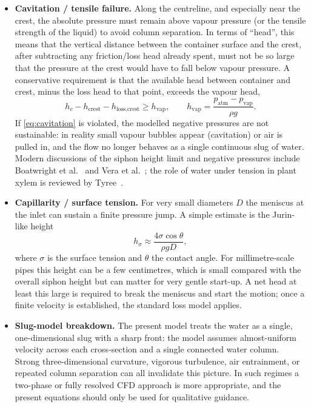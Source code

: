 \documentclass[11pt]{article}
\begin{document}
\begin{itemize}
  \item \textbf{Cavitation / tensile failure.} Along the centreline, and especially near the
    crest, the absolute pressure must remain above vapour pressure (or the tensile strength
    of the liquid) to avoid column separation. In terms of ``head'', this means that the
    vertical distance between the container surface and the crest, after subtracting any
    friction/loss head already spent, must not be so large that the pressure at the crest
    would have to fall below vapour pressure. A conservative requirement is that the
    available head between container and crest, minus the loss head to that point, exceeds
    the vapour head,
    \begin{equation}
      h_c - h_{\text{crest}} - h_{\text{loss,crest}} \ge h_{\mathrm{vap}},\qquad
      h_{\mathrm{vap}} = \frac{p_{\mathrm{atm}}-p_{\mathrm{vap}}}{\rho g}.
      \label{eq:cavitation}
    \end{equation}
    If \eqref{eq:cavitation} is violated, the modelled negative pressures are not sustainable:
    in reality small vapour bubbles appear (cavitation) or air is pulled in, and the flow
    no longer behaves as a single continuous slug of water. Modern discussions of the siphon
    height limit and negative pressures include Boatwright et al.~\cite{boatwright} and
    Vera et al.~\cite{vera}; the role of water under tension in plant xylem is reviewed by
    Tyree~\cite{tyree}.

  \item \textbf{Capillarity / surface tension.} For very small diameters $D$ the meniscus
    at the inlet can sustain a finite pressure jump. A simple estimate is the Jurin-like
    height
    \[
      h_{\sigma}\approx \frac{4\sigma\cos\theta}{\rho g D},
    \]
    where $\sigma$ is the surface tension and $\theta$ the contact angle. For millimetre-scale
    pipes this height can be a few centimetres, which is small compared with the overall
    siphon height but can matter for very gentle start-up. A net head at least this large is
    required to break the meniscus and start the motion; once a finite velocity is established,
    the standard loss model applies.

  \item \textbf{Slug-model breakdown.} The present model treats the water as a single,
    one-dimensional slug with a sharp front: the model assumes almost-uniform velocity
    across each cross-section and a single connected water column. Strong three-dimensional
    curvature, vigorous turbulence, air entrainment, or repeated column separation can all
    invalidate this picture. In such regimes a two-phase or fully resolved CFD approach is
    more appropriate, and the present equations should only be used for qualitative guidance.
\end{itemize}
\end{document}
